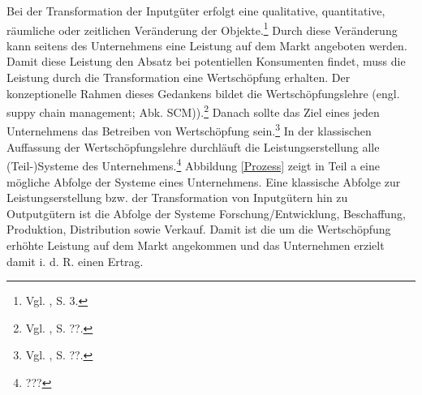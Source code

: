 Bei der Transformation der Inputgüter erfolgt eine qualitative, quantitative, räumliche oder zeitlichen Veränderung der Objekte.\footnote{Vgl. \cite{Dyckhoff2010}, S. 3.} Durch diese Veränderung kann seitens des Unternehmens eine Leistung auf dem Markt angeboten werden. Damit diese Leistung den Absatz bei potentiellen Konsumenten findet, muss die Leistung durch die Transformation eine Wertschöpfung erhalten. Der konzeptionelle Rahmen dieses Gedankens bildet die Wertschöpfungslehre (engl. suppy chain management; Abk. SCM)).\footnote{Vgl. \cite{???}, S. ??.} Danach sollte das Ziel eines jeden Unternehmens das Betreiben von Wertschöpfung sein.\footnote{Vgl. \cite{???}, S. ??.} In der klassischen Auffassung der Wertschöpfungslehre durchläuft die Leistungserstellung alle (Teil-)Systeme des Unternehmens.\footnote{???} Abbildung \ref{Prozess} zeigt in Teil a eine mögliche Abfolge der Systeme eines Unternehmens. Eine klassische Abfolge zur Leistungserstellung bzw. der Transformation von Inputgütern hin zu Outputgütern ist die Abfolge der Systeme Forschung/Entwicklung, Beschaffung, Produktion, Distribution sowie Verkauf. Damit ist die um die Wertschöpfung erhöhte Leistung auf dem Markt angekommen und das Unternehmen erzielt damit i. d. R. einen Ertrag.

